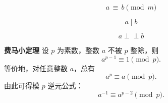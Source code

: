 \documentclass{ctexart}
\begin{document}
\[
a\,\equiv\,b\pmod{m}
\]

\[
a \mid b
\]

\[
a \perp\!\perp b
\]


\noindent \textbf{费马小定理}
设 $p$ 为素数，整数 $a$ 不被 $p$ 整除，则
\[
a^{p-1} \equiv 1 \pmod{p}.
\]
等价地，对任意整数 $a$，总有
\[
a^{p} \equiv a \pmod{p}.
\]
由此可得模 $p$ 逆元公式：
\[
a^{-1} \equiv a^{p-2} \pmod{p}.
\]
\end{document}
